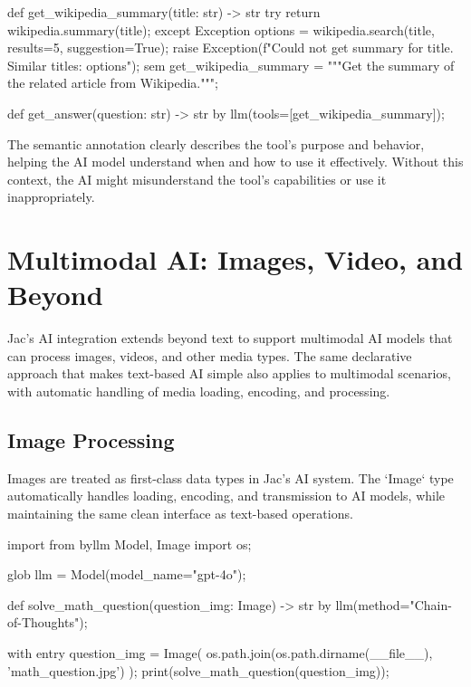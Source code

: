 \begin{jacblock}
def get_wikipedia_summary(title: str) -> str {
    try {
        return wikipedia.summary(title);
    } except Exception {
        options = wikipedia.search(title, results=5, suggestion=True);
        raise Exception(f"Could not get summary for {title}. Similar titles: {options}");
    }
}
sem get_wikipedia_summary = """Get the summary of the related article from Wikipedia.""";

def get_answer(question: str) -> str by llm(tools=[get_wikipedia_summary]);
\end{jacblock}

The semantic annotation clearly describes the tool's purpose and behavior, helping the AI model understand when and how to use it effectively. Without this context, the AI might misunderstand the tool's capabilities or use it inappropriately.

\section{Multimodal AI: Images, Video, and Beyond}

Jac's AI integration extends beyond text to support multimodal AI models that can process images, videos, and other media types. The same declarative approach that makes text-based AI simple also applies to multimodal scenarios, with automatic handling of media loading, encoding, and processing.

\subsection{Image Processing}

Images are treated as first-class data types in Jac's AI system. The `Image` type automatically handles loading, encoding, and transmission to AI models, while maintaining the same clean interface as text-based operations.

\begin{jacblock}
import from byllm { Model, Image }
import os;

glob llm = Model(model_name="gpt-4o");

def solve_math_question(question_img: Image) -> str by llm(method="Chain-of-Thoughts");

with entry {
    question_img = Image(
        os.path.join(os.path.dirname(__file__), 'math_question.jpg')
    );
    print(solve_math_question(question_img));
}
\end{jacblock}


